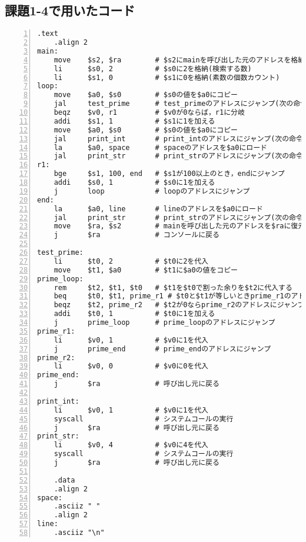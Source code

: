\subsection{課題1-4で用いたコード} \label{sec:p1-4}
\begin{Verbatim}[numbers=left, xleftmargin=10mm, numbersep=6pt,
                    fontsize=\small, baselinestretch=0.8]
    .text
    .align 2
main:
    move    $s2, $ra        # $s2にmainを呼び出した元のアドレスを格納
    li      $s0, 2          # $s0に2を格納(検索する数)
    li      $s1, 0          # $s1に0を格納(素数の個数カウント)
loop:
    move    $a0, $s0        # $s0の値を$a0にコピー
    jal     test_prime      # test_primeのアドレスにジャンプ(次の命令のアドレスを$raに)
    beqz    $v0, r1         # $v0が0ならば，r1に分岐
    addi    $s1, 1          # $s1に1を加える
    move    $a0, $s0        # $s0の値を$a0にコピー
    jal     print_int       # print_intのアドレスにジャンプ(次の命令のアドレスを$raに)
    la      $a0, space      # spaceのアドレスを$a0にロード
    jal     print_str       # print_strのアドレスにジャンプ(次の命令のアドレスを$raに)
r1:
    bge     $s1, 100, end   # $s1が100以上のとき，endにジャンプ
    addi    $s0, 1          # $s0に1を加える
    j       loop            # loopのアドレスにジャンプ
end:
    la      $a0, line       # lineのアドレスを$a0にロード
    jal     print_str       # print_strのアドレスにジャンプ(次の命令のアドレスを$raに)
    move    $ra, $s2        # mainを呼び出した元のアドレスを$raに復元
    j       $ra             # コンソールに戻る

test_prime:
    li      $t0, 2          # $t0に2を代入
    move    $t1, $a0        # $t1に$a0の値をコピー
prime_loop:
    rem     $t2, $t1, $t0   # $t1を$t0で割った余りを$t2に代入する
    beq     $t0, $t1, prime_r1 # $t0と$t1が等しいときprime_r1のアドレスにジャンプ
    beqz    $t2, prime_r2   # $t2が0ならprime_r2のアドレスにジャンプ
    addi    $t0, 1          # $t0に1を加える
    j       prime_loop      # prime_loopのアドレスにジャンプ
prime_r1:
    li      $v0, 1          # $v0に1を代入
    j       prime_end       # prime_endのアドレスにジャンプ
prime_r2:
    li      $v0, 0          # $v0に0を代入
prime_end:
    j       $ra             # 呼び出し元に戻る

print_int:
    li      $v0, 1          # $v0に1を代入
    syscall                 # システムコールの実行
    j       $ra             # 呼び出し元に戻る
print_str:
    li      $v0, 4          # $v0に4を代入
    syscall                 # システムコールの実行
    j       $ra             # 呼び出し元に戻る

    .data
    .align 2
space:
    .asciiz " "
    .align 2
line:
    .asciiz "\n"
\end{Verbatim}


